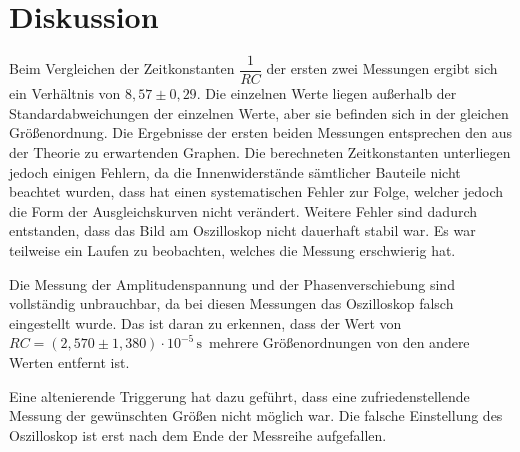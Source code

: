 \section{Diskussion}
\label{sec:Diskussion}


Beim Vergleichen der Zeitkonstanten $ \dfrac{1}{RC}$ der ersten zwei Messungen ergibt sich ein Verhältnis von  $8,57 \pm 0,29$. 
Die einzelnen Werte liegen außerhalb der Standardabweichungen der einzelnen Werte, aber sie befinden sich in der gleichen Größenordnung.
Die Ergebnisse der ersten beiden Messungen entsprechen den aus der Theorie zu erwartenden Graphen.
Die berechneten Zeitkonstanten unterliegen jedoch einigen Fehlern, da die Innenwiderstände sämtlicher Bauteile nicht beachtet wurden, dass hat einen systematischen Fehler zur Folge, welcher jedoch die Form der Ausgleichskurven nicht verändert.
Weitere Fehler sind dadurch entstanden, dass das Bild am Oszilloskop nicht dauerhaft stabil war. Es war teilweise ein Laufen zu beobachten, welches die Messung erschwierig hat. 

Die Messung der Amplitudenspannung und der Phasenverschiebung sind vollständig unbrauchbar, da bei diesen Messungen das Oszilloskop falsch eingestellt wurde.
Das ist daran zu erkennen, dass der Wert von $RC = (2,570 \pm 1,380) \cdot 10^{-5} \, \unit{\second} \,$ mehrere Größenordnungen von den andere Werten entfernt ist.

Eine altenierende Triggerung hat dazu geführt, dass eine zufriedenstellende Messung der gewünschten Größen nicht möglich war.
Die falsche Einstellung des Oszilloskop ist erst nach dem Ende der Messreihe aufgefallen.
